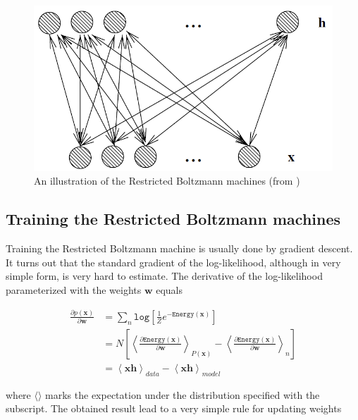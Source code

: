 \begin{figure}
	\begin{center}
		\includegraphics[scale=0.5]{Figures/describing/restricted_boltzmann_machines}
	\end{center}
	\caption{An illustration of the Restricted Boltzmann machines (from \cite{Bengio2009})}
	\label{img:RestBoltzMach}
\end{figure}


\subsection{Training the Restricted Boltzmann machines}

Training the Restricted Boltzmann machine is usually done by gradient descent. It turns out that the standard gradient of the log-likelihood, although in very simple form, is very hard to estimate. The derivative of the log-likelihood parameterized with the weights $\mathbf{w}$ equals

\begin{align}
		\frac{\partial p(\mathbf{x})}{\partial \mathbf{w}} & = \sum_n \mathtt{log} \left [ \frac{1}{Z} e ^{-\mathtt{Energy}(\mathbf{x})}  \right ] \\
		& = N \left [ \left \langle \frac{\partial \mathtt{Energy}(\mathbf{x})}{\partial \mathbf{w}}  \right \rangle_{P(\mathbf{x})} - \left \langle \frac{\partial \mathtt{Energy}(\mathbf{x})}{\partial \mathbf{w}} \right \rangle_n  \right ] \\
		& = \left \langle \mathbf{x}\mathbf{h} \right \rangle_{data} - \left \langle \mathbf{x}\mathbf{h} \right \rangle_{model}
\end{align}

where $\langle \rangle$ marks the expectation under the distribution specified with the subscript. The obtained result lead to a very simple rule for updating weights

